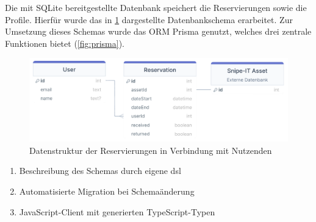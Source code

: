 Die mit SQLite bereitgestellte Datenbank speichert die Reservierungen sowie die
Profile. Hierfür wurde das in \ref{fig:orm} dargestellte Datenbankschema
erarbeitet. Zur Umsetzung dieses Schemas wurde das ORM Prisma genutzt, welches
drei zentrale Funktionen bietet (\ref{fig:prisma}).
\begin{figure}[h]
  \centering
  \includegraphics[scale=0.35]{Bilder/Code/UML_DB.png}
  \caption[Datenstruktur der Reservierungen in Verbindung mit Nutzenden]{Datenstruktur der Reservierungen in Verbindung mit Nutzenden}
  \label{fig:orm}
\end{figure}

\begin{enumerate}
  \item Beschreibung des Schemas durch eigene \ac{dsl}
  \item Automatisierte Migration bei Schemaänderung
  \item JavaScript-Client mit generierten TypeScript-Typen
\end{enumerate}

